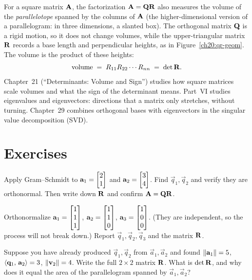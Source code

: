 \begin{connectionbox}
For a square matrix $\mathbf{A}$, the factorization $\mathbf{A} = \mathbf{Q}\mathbf{R}$ also measures the
volume of the \emph{parallelotope} spanned by the columns of $\mathbf{A}$ (the higher-dimensional
version of a parallelogram: in three dimensions, a slanted box). The orthogonal matrix
$\mathbf{Q}$ is a rigid motion, so it does not change volumes, while the upper-triangular matrix
$\mathbf{R}$ records a base length and perpendicular heights, as in Figure~\ref{ch20:qr-geom}.
The volume is the product of these heights:
\[
  \text{volume} \;=\; R_{11} R_{22} \cdots R_{nn} \;=\; \det\mathbf{R}.
\]
Chapter~21 (``Determinants: Volume and Sign'') studies how square matrices scale volumes
and what the sign of the determinant means. Part~VI studies eigenvalues and eigenvectors:
directions that a matrix only stretches, without turning. Chapter~29 combines
orthogonal bases with eigenvectors in the singular value decomposition (SVD).
\end{connectionbox}

\section{Exercises}

\begin{exercise}
Apply Gram--Schmidt to $\mathbf{a}_1=\begin{bmatrix}2\\1\end{bmatrix}$ and $\mathbf{a}_2=\begin{bmatrix}3\\4\end{bmatrix}$. Find
$\vec{q}_1,\vec{q}_2$ and verify they are orthonormal. Then write down $\mathbf{R}$ and
confirm $\mathbf{A}=\mathbf{Q}\mathbf{R}$.
\end{exercise}

\begin{exercise}
Orthonormalize
$\mathbf{a}_1=\begin{bmatrix}1\\1\\1\end{bmatrix}$, $\mathbf{a}_2=\begin{bmatrix}1\\1\\0\end{bmatrix}$, $\mathbf{a}_3=\begin{bmatrix}1\\0\\0\end{bmatrix}$.
(They are independent, so the process will not break down.) Report
$\vec{q}_1,\vec{q}_2,\vec{q}_3$ and the matrix $\mathbf{R}$.
\end{exercise}

\begin{exercise}
Suppose you have already produced $\vec{q}_1,\vec{q}_2$ from $\vec{a}_1,\vec{a}_2$ and
found $\lVert\mathbf{a}_1\rVert=5$, $\langle \mathbf{q}_1,\, \mathbf{a}_2 \rangle=3$, $\lVert\mathbf{v}_2\rVert=4$.
Write the full $2\times 2$ matrix $\mathbf{R}$. What is $\det\mathbf{R}$, and why does it
equal the area of the parallelogram spanned by $\vec{a}_1,\vec{a}_2$?
\end{exercise}

